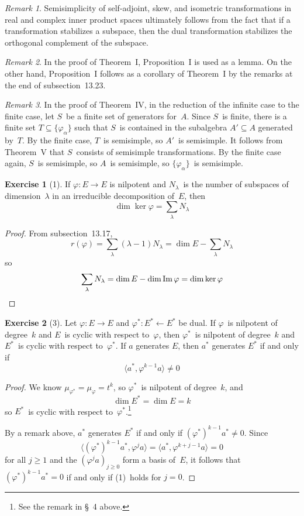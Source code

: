 \documentclass[letterpaper,12pt]{article}
\newcommand{\from}{\leftarrow}
\DeclareMathOperator{\im}{Im}
\newcommand{\sprod}[2]{\langle#1,#2\rangle}
\theoremstyle{definition}
\newtheorem*{exer}{Exercise}
\theoremstyle{remark}
\newtheorem*{rmk}{Remark}
\begin{document}
\begin{rmk}
Semisimplicity of self-adjoint, skew, and isometric transformations in real and complex inner product spaces ultimately follows from the fact that if a transformation stabilizes a subspace, then the dual transformation stabilizes the orthogonal complement of the subspace.
\end{rmk}

\begin{rmk}
In the proof of Theorem~I, Proposition~I is used as a lemma. On the other hand, Proposition~I follows as a corollary of Theorem~I by the remarks at the end of subsection~13.23.
\end{rmk}

\begin{rmk}
In the proof of Theorem~IV, in the reduction of the infinite case to the finite case, let \(S\)~be a finite set of generators for~\(A\). Since \(S\)~is finite, there is a finite set \(T\subseteq\{\varphi_{\alpha}\}\) such that \(S\)~is contained in the subalgebra \(A'\subseteq A\) generated by~\(T\). By the finite case, \(T\)~is semisimple, so \(A'\)~is semisimple. It follows from Theorem~V that \(S\)~consists of semisimple transformations. By the finite case again, \(S\)~is semisimple, so \(A\)~is semisimple, so \(\{\varphi_{\alpha}\}\)~is semisimple.
\end{rmk}

\begin{exer}[1]
If \(\varphi:E\to E\) is nilpotent and \(N_{\lambda}\)~is the number of subspaces of dimension~\(\lambda\) in an irreducible decomposition of~\(E\), then
\[\dim\ker\varphi=\sum_{\lambda}N_{\lambda}\]
\end{exer}
\begin{proof}
From subsection~13.17,
\[r(\varphi)=\sum_{\lambda}(\lambda-1)N_{\lambda}=\dim E-\sum_{\lambda}N_{\lambda}\]
so
\[\sum_{\lambda}N_{\lambda}=\dim E-\dim\im\varphi=\dim\ker\varphi\qedhere\]
\end{proof}

\begin{exer}[3]
Let \(\varphi:E\to E\) and \(\varphi^*:E^*\from E^*\) be dual. If \(\varphi\)~is nilpotent of degree~\(k\) and \(E\)~is cyclic with respect to~\(\varphi\), then \(\varphi^*\)~is nilpotent of degree~\(k\) and \(E^*\)~is cyclic with respect to~\(\varphi^*\). If \(a\) generates \(E\), then \(a^*\) generates \(E^*\) if and only if
\[\sprod{a^*}{\varphi^{k-1}a}\ne0\]
\end{exer}
\begin{proof}
We know \(\mu_{\varphi^*}=\mu_{\varphi}=t^k\), so \(\varphi^*\)~is nilpotent of degree~\(k\), and
\[\dim E^*=\dim E=k\]
so \(E^*\)~is cyclic with respect to~\(\varphi^*\).\footnote{See the remark in \S~4 above.}

By a remark above, \(a^*\) generates \(E^*\) if and only if \((\varphi^*)^{k-1}a^*\ne0\). Since
\[\sprod{(\varphi^*)^{k-1}a^*}{\varphi^j a}=\sprod{a^*}{\varphi^{k+j-1}a}=0\tag{1}\]
for all \(j\ge 1\) and the \((\varphi^j a)_{j\ge 0}\) form a basis of~\(E\), it follows that \((\varphi^*)^{k-1}a^*=0\) if and only if (1)~holds for \(j=0\).
\end{proof}
\end{document}
